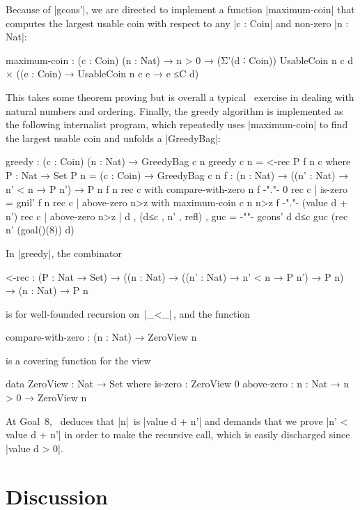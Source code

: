 Because of |gcons'|, we are directed to implement a function |maximum-coin| that computes the largest usable coin with respect to any |c : Coin| and non-zero |n : Nat|:
\begin{code}
maximum-coin :
  (c : Coin) (n : Nat) → n > 0 →
  (Σ'(d ∶ Coin))  UsableCoin n c d × ((e : Coin) → UsableCoin n c e → e ≤C d)
\end{code}
This takes some theorem proving but is overall a typical \Agda\ exercise in dealing with natural numbers and ordering.
Finally, the greedy algorithm is implemented as the following internalist program, which repeatedly uses |maximum-coin| to find the largest usable coin and unfolds a |GreedyBag|:
\begin{code}
greedy : (c : Coin) (n : Nat) → GreedyBag c n
greedy c n = <-rec P f n c
  where
    P : Nat → Set
    P n = (c : Coin) → GreedyBag c n
    f : (n : Nat) → ((n' : Nat) → n' < n → P n') → P n
    f          n               rec  c  with compare-with-zero n 
    f {-"."-}  0               rec  c  | is-zero = gnil'
    f          n               rec  c  | above-zero n>z   with maximum-coin c n n>z
    f {-"."-}  (value d + n')  rec  c  | above-zero n>z   |  d , (d≤c , n' , refl) , guc = {-"\quad"-}
                                                             gcons' d d≤c guc (rec n' (goal()(8)) d)
\end{code}
In |greedy|, the combinator
\begin{code}
<-rec :  (P : Nat → Set) →
         ((n : Nat) → ((n' : Nat) → n' < n → P n') → P n) →
         (n : Nat) → P n
\end{code}
is for well-founded recursion on~|_<_|\,, and the function
\begin{code}
compare-with-zero : (n : Nat) → ZeroView n
\end{code}
is a covering function for the view
\begin{code}
data ZeroView : Nat → Set where
  is-zero     :  ZeroView 0
  above-zero  :  {n : Nat} → n > 0 → ZeroView n
\end{code}
At Goal~8, \Agda\ deduces that |n|~is |value d + n'| and demands that we prove |n' < value d + n'| in order to make the recursive call, which is easily discharged since |value d > 0|.

\section{Discussion}
\label{sec:algebraic-discussion}

